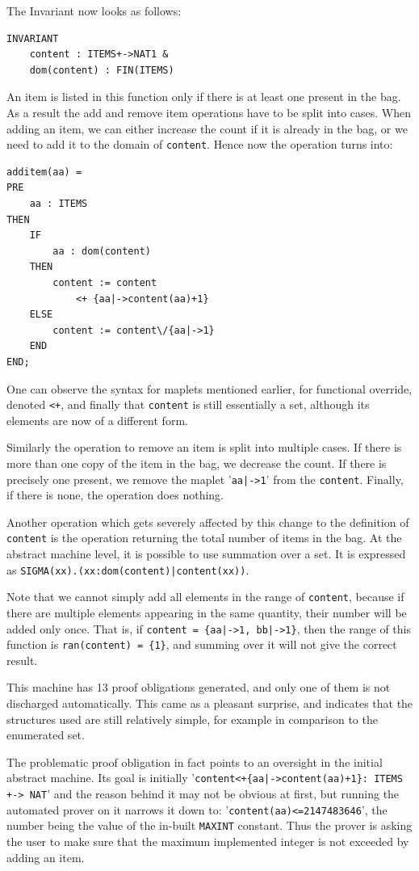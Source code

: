 \documentclass[11pt,journal]{IEEEtran}
\begin{document}
	The Invariant now looks as follows:
	\begin{lstlisting}
INVARIANT
	content : ITEMS+->NAT1 &
	dom(content) : FIN(ITEMS)
	\end{lstlisting}

	An item is listed in this function only if there is at least one present in the bag. As a result the add and remove item operations have to be split into cases. When adding an item, we can either increase the count if it is already in the bag, or we need to add it to the domain of \texttt{content}. Hence now the operation turns into:
	\begin{lstlisting}
additem(aa) =
PRE
	aa : ITEMS
THEN
	IF 
		aa : dom(content) 
	THEN
		content := content 
			<+ {aa|->content(aa)+1}
	ELSE
		content := content\/{aa|->1}
	END
END;
	\end{lstlisting}
	One can observe the syntax for maplets mentioned earlier, for functional override, denoted \texttt{<+}, and finally that \texttt{content} is still essentially a set, although its elements are now of a different form.
	
	Similarly the operation to remove an item is split into multiple cases. If there is more than one copy of the item in the bag, we decrease the count. If there is precisely one present, we remove the maplet '\texttt{aa|->1}' from the \texttt{content}. Finally, if there is none, the operation does nothing.
	
	Another operation which gets severely affected by this change to the definition of \texttt{content} is the operation returning the total number of items in the bag. At the abstract machine level, it is possible to use summation over a set. It is expressed as \verb=SIGMA(xx).(xx:dom(content)|content(xx))=. 
	
	Note that we cannot simply add all elements in the range of \texttt{content}, because if there are multiple elements appearing in the same quantity, their number will be added only once. That is, if \texttt{content = \{aa|->1, bb|->1\}}, then the range of this function is \texttt{ran(content) = \{1\}}, and summing over it will not give the correct result.
	
	This machine has 13 proof obligations generated, and only one of them is not discharged automatically. This came as a pleasant surprise, and indicates that the structures used are still relatively simple, for example in comparison to the enumerated set.
	
	The problematic proof obligation in fact points to an oversight in the initial abstract machine. Its goal is initially '\texttt{content<+\{aa|->content(aa)+1\}: ITEMS +-> NAT}' and the reason behind it may not be obvious at first, but running the automated prover on it narrows it down to: '\texttt{content(aa)<=2147483646}', the number being the value of the in-built \texttt{MAXINT} constant. Thus the prover is asking the user to make sure that the maximum implemented integer is not exceeded by adding an item.
	
\end{document}
